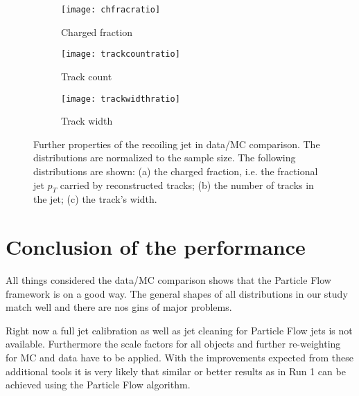 \begin{figure}[h]
\centering
\begin{subfigure}[b]{0.5\figwidth}
\texttt{[image: chfracratio]}
\caption[Charged fraction]{Charged fraction}
\label{fig:chfrac}
\end{subfigure}


\centering
\begin{subfigure}[b]{0.5\figwidth}
\texttt{[image: trackcountratio]}
\caption[Track count]{Track count}
\label{fig:trackcount}
\end{subfigure}
\quad
\begin{subfigure}[b]{0.5\figwidth}
\texttt{[image: trackwidthratio]}
\caption[trackwidth]{Track width}
\label{fig:trackwidth}
\end{subfigure}
\caption{Further properties of the recoiling jet in data/MC comparison. The distributions are normalized to the sample size. The following distributions are shown: (a) the charged fraction, i.e. the fractional jet $p_T$ carried by reconstructed tracks; (b) the number of tracks in the jet; (c) the track's width.}
\label{fig:generalproperties}
\end{figure}


\section{Conclusion of the performance}

All things considered the data/MC comparison shows that the Particle Flow framework is on a good way. The general shapes of all distributions in our study match well and there are nos gins of major problems.

Right now a full jet calibration as well as jet cleaning for Particle Flow jets is not available. Furthermore the scale factors for all objects and further re-weighting for MC and data have to be applied.
With the improvements expected from these additional tools it is very likely that similar or better results as in Run 1 can be achieved using the Particle Flow algorithm.


\label{results}
